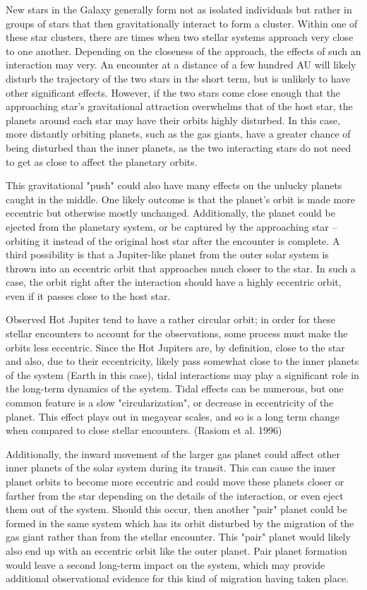 \documentclass[12pt]{article}
\begin{document}
New stars in the Galaxy generally form not as isolated individuals but rather in groups of stars
that then gravitationally interact to form a cluster.
Within one of these star clusters, there are times when two stellar systems approach very close
to one another. Depending on the closeness of the approach, the effects of such
an interaction may very. An encounter at a distance of a few hundred AU will likely disturb the trajectory
of the two stars in the short term, but is unlikely to have other significant effects. However,
if the two stars come close enough that the approaching star's gravitational attraction
overwhelms that of the host star, the planets around each star may have their orbits
highly disturbed. In this case, more distantly orbiting planets, such as the gas giants,
have a greater chance of being disturbed than the inner planets, as the two 
interacting stars do not need to get as close to affect the planetary orbits.

This gravitational "push" could also have many effects on the unlucky planets caught in the
middle. One likely outcome is that the planet's orbit is made more eccentric but otherwise
mostly unchanged. Additionally, the planet could be ejected from the planetary system,
or be captured by the approaching star -- orbiting it instead of the original host star
after the encounter is complete. A third possibility is that a Jupiter-like planet
from the outer solar system is thrown into an eccentric 
orbit that approaches much closer to the
star. In such a case, the orbit right after the interaction should have a highly
eccentric orbit, even if it passes close to the host star. 

Observed Hot Jupiter tend to have a rather circular orbit; in order for these stellar 
encounters to account for the observations, some process must make the orbits 
less eccentric. Since the Hot Jupiters are, by definition, close to the star and
also, due to their eccentricity, likely pass somewhat close to the inner planets of the
system (Earth in this case), tidal interactions may play a significant role in the
long-term dynamics of the system. Tidal effects can be numerous, but one common feature
is a slow "circularization", or decrease in eccentricity of the planet. This effect
plays out in megayear scales, and so is a long term change when compared to close stellar
encounters. (Rasiom et al. 1996)

Additionally, the inward movement of the larger gas planet could affect other
inner planets of the solar system during its transit. This can
cause the inner planet orbits to become more eccentric and could move
these planets closer or farther from the star depending on the details of the
interaction, or even eject them out of the system. Should this occur,
then another "pair" planet could be formed in the same system which has its orbit
disturbed by the migration of the gas giant rather than from the stellar encounter. 
This "pair" planet 
would likely also end up with an eccentric orbit like the outer planet. Pair planet formation would leave
a second long-term impact on the system, which may provide additional observational
evidence for this kind of migration having taken place.
\end{document}
